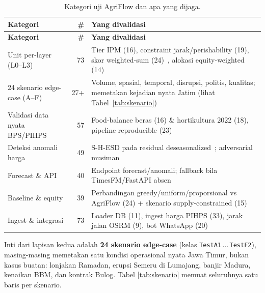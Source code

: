\documentclass[11pt,a4paper]{article}
\newcommand{\code}[1]{\texttt{#1}}
\begin{document}
\begin{center}
\begin{longtable}{p{5.4cm}rp{6.2cm}}
\caption{Kategori uji AgriFlow dan apa yang dijaga.}\label{tab:kategori-uji}\\
\toprule
\textbf{Kategori} & \textbf{\#} & \textbf{Yang divalidasi} \\
\midrule
\endfirsthead
\toprule
\textbf{Kategori} & \textbf{\#} & \textbf{Yang divalidasi} \\
\midrule
\endhead
Unit per-layer (L0--L3) & 73 & Tier IPM (16), constraint jarak/perishability (19), skor weighted-sum (24)~\cite{bazgan2021}, alokasi equity-weighted (14)~\cite{firouz2021} \\
24 skenario edge-case (A--F) & 27+ & Volume, spasial, temporal, disrupsi, politis, kualitas; memetakan kejadian nyata Jatim (lihat Tabel~\ref{tab:skenario}) \\
Validasi data nyata BPS/PIHPS & 57 & Food-balance beras (16) \& hortikultura 2022 (18), pipeline reproducible (23) \\
Deteksi anomali harga & 49 & S-H-ESD pada residual deseasonalized~\cite{shesd2017}; adversarial musiman~\cite{liu2024} \\
Forecast \& API & 40 & Endpoint forecast/anomali; fallback bila TimesFM/FastAPI absen~\cite{timesfm2023} \\
Baseline \& equity & 39 & Perbandingan greedy/uniform/proporsional vs AgriFlow (24) + skenario supply-constrained (15)~\cite{alem2021,hakimifar2022} \\
Ingest \& integrasi & 73 & Loader DB (11), ingest harga PIHPS (33), jarak jalan OSRM (9), bot WhatsApp (20) \\
\bottomrule
\end{longtable}
\end{center}

\noindent
Inti dari lapisan kedua adalah \textbf{24 skenario edge-case} (kelas
\code{TestA1}\,$\ldots$\,\code{TestF2}), masing-masing memetakan satu kondisi
operasional nyata Jawa Timur, bukan kasus buatan: lonjakan Ramadan, erupsi
Semeru di Lumajang, banjir Madura, kenaikan BBM, dan kontrak Bulog. Tabel
\ref{tab:skenario} memuat seluruhnya satu baris per skenario.
\end{document}

